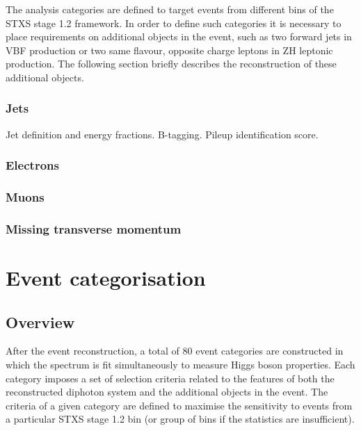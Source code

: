 The analysis categories are defined to target events from different bins of the STXS stage 1.2 framework. In order to define such categories it is necessary to place requirements on additional objects in the event, such as two forward jets in VBF production or two same flavour, opposite charge leptons in ZH leptonic production. The following section briefly describes the reconstruction of these additional objects.

\subsubsection{Jets}
Jet definition and energy fractions. B-tagging. Pileup identification score.

\subsubsection{Electrons}

\subsubsection{Muons}

\subsubsection{Missing transverse momentum}





\newpage
\section{Event categorisation}\label{sec:event_categorisation}

\subsection{Overview}
After the event reconstruction, a total of 80 event categories are constructed in which the \mgg spectrum is fit simultaneously to measure Higgs boson properties. Each category imposes a set of selection criteria related to the features of both the reconstructed diphoton system and the additional objects in the event. The criteria of a given category are defined to maximise the sensitivity to events from a particular STXS stage 1.2 bin (or group of bins if the statistics are insufficient).

